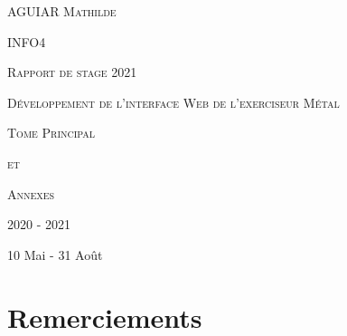 \documentclass[12pt]{article}
\begin{document}
\singlespace %

\begin{titlepage}
    \par
	\hfill
	\par
	\vfill
	
	\centering
	{\scshape \Large AGUIAR Mathilde \par}
	{\scshape \Large INFO4 \par}
	{\scshape \Large Rapport de stage 2021 \par}
	
	\vfill
	{\scshape \huge Développement de l'interface Web de l'exerciseur Métal \par}
	
	\vfill
	{\scshape\Large Tome Principal \par}
	{\scshape \Large et \par}
	{\scshape \Large Annexes \par}
	
	\vfill
	{\Large 2020 - 2021 \par}
	{\Large 10 Mai - 31 Août \par}
\end{titlepage}



\newpage


\section*{Remerciements}
\end{document}
